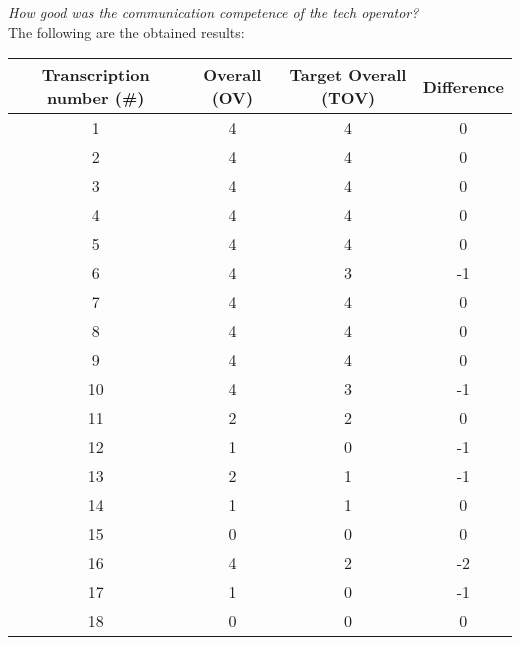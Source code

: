 \textit{How good was the communication competence of the tech operator?}\\

The following are the obtained results:\\
\begin{center}
      \begin{tabular}{cccc}
            \toprule
            Transcription number (\#) & Overall (OV) & Target Overall (TOV) & Difference \\
            \midrule
            1                         & 4            & 4                    & 0          \\
            2                         & 4            & 4                    & 0          \\
            3                         & 4            & 4                    & 0          \\
            4                         & 4            & 4                    & 0          \\
            5                         & 4            & 4                    & 0          \\
            6                         & 4            & 3                    & -1         \\
            7                         & 4            & 4                    & 0          \\
            8                         & 4            & 4                    & 0          \\
            9                         & 4            & 4                    & 0          \\
            10                        & 4            & 3                    & -1         \\
            11                        & 2            & 2                    & 0          \\
            12                        & 1            & 0                    & -1         \\
            13                        & 2            & 1                    & -1         \\
            14                        & 1            & 1                    & 0          \\
            15                        & 0            & 0                    & 0          \\
            16                        & 4            & 2                    & -2         \\
            17                        & 1            & 0                    & -1         \\
            18                        & 0            & 0                    & 0          \\
            \bottomrule
      \end{tabular}

\end{center}

